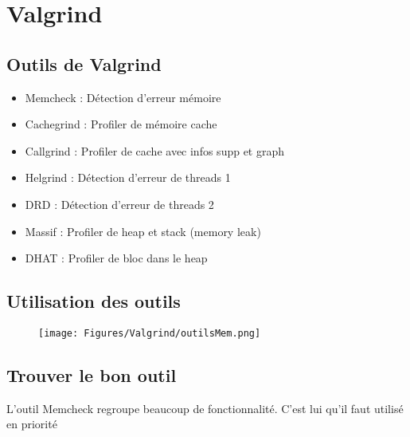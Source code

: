 \documentclass[resume]{subfiles}
\begin{document}
\section{Valgrind}

\subsection{Outils de Valgrind}
\begin{itemize}
\item Memcheck : Détection d'erreur mémoire
\item Cachegrind : Profiler de mémoire cache
\item Callgrind : Profiler de cache avec infos supp et graph
\item Helgrind : Détection d'erreur de threads 1
\item DRD : Détection d'erreur de threads 2
\item Massif : Profiler de heap et stack (memory leak)
\item DHAT : Profiler de bloc dans le heap
\end{itemize}

\subsection{Utilisation des outils}
\begin{figure}[H]
    \centering
    \texttt{[image: Figures/Valgrind/outilsMem.png]}
\end{figure}

\subsection{Trouver le bon outil}
L'outil Memcheck regroupe beaucoup de fonctionnalité. C'est lui qu'il faut utilisé en priorité
\end{document}
